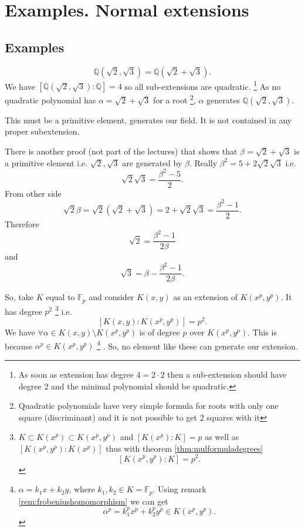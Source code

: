 \section{Examples. Normal extensions}

\subsection{Examples}

\begin{example}
  \[
  \mathbb{Q}\left(\sqrt{2}, \sqrt{3}\right) =
  \mathbb{Q}\left(\sqrt{2} + \sqrt{3}\right).
  \]
  We have
  $\left[\mathbb{Q}\left(\sqrt{2}, \sqrt{3}\right) :
    \mathbb{Q}\right] = 4$ so all sub-extensions are quadratic.
  \footnote{
    As soon as extension has degree $4 = 2 \cdot 2$ then a
    sub-extension should have 
    degree 2 and the minimal polynomial should be quadratic.
  }
  As no
  quadratic polynomial has $\alpha = \sqrt{2} + \sqrt{3}$ for a root
  \footnote{
    Quadratic polynomials have very simple formula for roots with
    only one square (discriminant) and it is not possible to get 2
    squares with it 
  },
  $\alpha$ generates $\mathbb{Q}\left(\sqrt{2}, \sqrt{3}\right)$.

  This must be a primitive element, generates our field. 
  It is not contained in any proper subextension.

  There is another proof (not part of the lectures) that shows that
  $\beta = \sqrt{2} + \sqrt{3}$ is a primitive element i.e.
  $\sqrt{2}, \sqrt{3}$ are generated by $\beta$. Really
  $\beta^2 = 5 + 2 \sqrt{2}\sqrt{3}$ i.e.
  \[
  \sqrt{2}\sqrt{3} = \frac{\beta^2 - 5}{2}.
  \]
  From other side
  \[
  \sqrt{2} \beta = \sqrt{2}\left(\sqrt{2} + \sqrt{3}\right) =
  2 + \sqrt{2}\sqrt{3} = \frac{\beta^2 - 1}{2}.
  \]
  Therefore
  \[
  \sqrt{2} = \frac{\beta^2 - 1}{2 \beta}
  \]
  and
  \[
  \sqrt{3} = \beta - \frac{\beta^2 - 1}{2 \beta}.
  \]  
\end{example}

\begin{example}
  So, take $K$ equal to $\mathbb{F}_p$ and consider
  $K\left(x,y\right)$ as an
  extension of $K\left(x^p,y^p\right)$. It has degree $p^2$
  \footnote {
    $K \subset K\left(x^p\right) \subset K\left(x^p,y^p\right)$ and
    $\left[K\left(x^p\right): K\right] = p$ as well as
    $\left[K\left(x^p, y^p\right): K\left(x^p\right)\right]$ thus with
    theorem \ref{thm:mulformuladegrees}
    \[
    \left[K\left(x^p, y^p\right): K\right] = p^2.
    \]
  }
  i.e.
  \[
  \left[
    K\left(x,y\right) : K\left(x^p,y^p\right)
    \right] = p^2.
  \]
  We have $\forall \alpha \in K\left(x,y\right) \setminus
  K\left(x^p,y^p\right)$ is of degree $p$ over
  $K\left(x^p,y^p\right)$. This is because
  $\alpha^p \in K\left(x^p,y^p\right)$
  \footnote{
    $\alpha = k_1 x + k_2 y$, where $k_1, k_2 \in K =
    \mathbb{F}_p$. Using remark \ref{rem:frobeniushomomorphism} we can
    get
    \[
    \alpha^p = k_1^p x^p + k_2^p y^p \in K\left(x^p, y^p\right).
    \]
  }
  . So, no element like these can
  generate our extension.  
\end{example}

